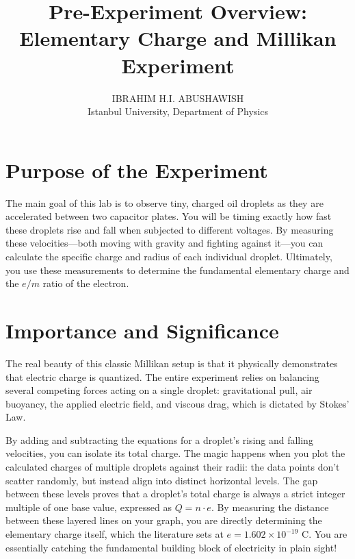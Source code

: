 \documentclass[11pt,a4paper]{article}
\title{\textbf{Pre-Experiment Overview:\\ Elementary Charge and Millikan Experiment}}
\author{IBRAHIM H.I. ABUSHAWISH \\ Istanbul University, Department of Physics}
\date{}
\begin{document}
\maketitle

\section*{Purpose of the Experiment}
The main goal of this lab is to observe tiny, charged oil droplets as they are accelerated between two capacitor plates. You will be timing exactly how fast these droplets rise and fall when subjected to different voltages. By measuring these velocities---both moving with gravity and fighting against it---you can calculate the specific charge and radius of each individual droplet. Ultimately, you use these measurements to determine the fundamental elementary charge and the $e/m$ ratio of the electron.

\section*{Importance and Significance}
The real beauty of this classic Millikan setup is that it physically demonstrates that electric charge is quantized. The entire experiment relies on balancing several competing forces acting on a single droplet: gravitational pull, air buoyancy, the applied electric field, and viscous drag, which is dictated by Stokes' Law.

By adding and subtracting the equations for a droplet's rising and falling velocities, you can isolate its total charge. The magic happens when you plot the calculated charges of multiple droplets against their radii: the data points don't scatter randomly, but instead align into distinct horizontal levels. The gap between these levels proves that a droplet's total charge is always a strict integer multiple of one base value, expressed as $Q = n \cdot e$. By measuring the distance between these layered lines on your graph, you are directly determining the elementary charge itself, which the literature sets at $e = 1.602 \times 10^{-19}\text{ C}$. You are essentially catching the fundamental building block of electricity in plain sight!
\end{document}
